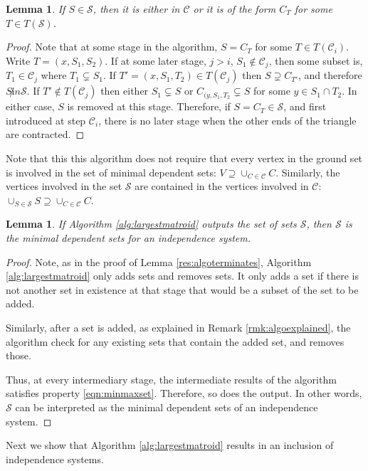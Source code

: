 \documentclass[11pt]{article}
\newcommand{\sC}{\mathscr{C}}
\newcommand{\sS}{\mathscr{S}}
\newtheorem{lem}[thm]{Lemma}
\theoremstyle{remark}
\theoremstyle{definition}
\begin{document}
\begin{lem} \label{res:placedsetsCT}
    If $S \in \sS$, then it is either in $\sC$ or it is of the form $C_T$ for some $T \in T(\sS)$.
\end{lem}
\begin{proof}
Note that at some stage in the algorithm, $S = C_T$ for some $T \in T(\sC_{i})$. Write $T = (x, S_1, S_2)$. If at some later stage, $j > i$, $S_1 \not \in \sC_j$, then some subset is, $T_1 \in \sC_j$ where $T_1 \subsetneq S_1$. If $T' = (x, S_1, T_2) \in T(\sC_j)$ then $S \supsetneq C_{T'}$, and therefore $S \not in \sS$. If $T' \not \in T(\sC_{j})$ then either $S_1 \subsetneq S$ or $C_{(y, S_1, T_2} \subsetneq S$ for some $y \in S_1 \cap T_2$. In either case, $S$ is removed at this stage. Therefore, if $S = C_T \in \sS$, and first introduced at step $\sC_i$, there is no later stage when the other ends of the triangle are contracted.
\end{proof}

Note that this this algorithm does not require that every vertex in the ground set is involved in the set of minimal dependent sets: $V \supseteq \cup_{C \in \sC} C$. Similarly,  the vertices involved in the set $\sS$ are contained in the vertices involved in $\sC$: $\cup_{S \in \sS} S \supseteq \cup_{C \in \sC} C$. 



\begin{lem}\label{res:algogivesminimal}
    If Algorithm \ref{alg:largestmatroid} outputs the set of sets $\sS$, then $\sS$ is the minimal dependent sets for an independence system.
\end{lem}
\begin{proof}
    Note, as in the proof of Lemma \ref{res:algoterminates}, Algorithm \ref{alg:largestmatroid} only adds sets and removes sets. It only adds a set if there is not another set in existence at that stage that would be a subset of the set to be added. 

    Similarly, after a set is added, as explained in Remark \ref{rmk:algoexplained}, the algorithm check for any existing sets that contain the added set, and removes those.

    Thus, at every intermediary stage, the intermediate results of the algorithm satisfies property \eqref{eqn:minmaxset}. Therefore, so does the output. In other words, $\sS$ can be interpreted as the minimal dependent sets of an independence system.
\end{proof}

Next we show that Algorithm \ref{alg:largestmatroid} results in an inclusion of independence systems.
\end{document}
